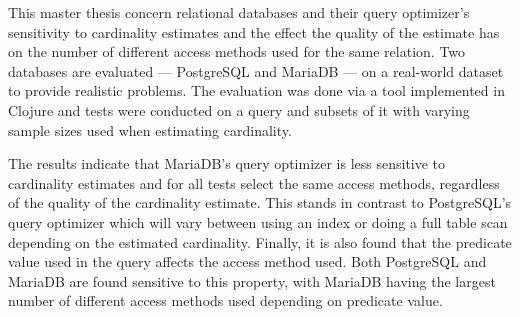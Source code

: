 This master thesis concern relational databases and their query optimizer's
sensitivity to cardinality estimates and the effect the quality of the estimate
has on the number of different access methods used for the same relation. Two
databases are evaluated --- PostgreSQL and MariaDB --- on a real-world dataset
to provide realistic problems. The evaluation was done via a tool implemented in
Clojure and tests were conducted on a query and subsets of it with varying
sample sizes used when estimating cardinality.

The results indicate that MariaDB's query optimizer is less sensitive to
cardinality estimates and for all tests select the same access methods,
regardless of the quality of the cardinality estimate. This stands in contrast
to PostgreSQL's query optimizer which will vary between using an index or doing
a full table scan depending on the estimated cardinality. Finally, it is also
found that the predicate value used in the query affects the access method used.
Both PostgreSQL and MariaDB are found sensitive to this property, with MariaDB
having the largest number of different access methods used depending on
predicate value.
